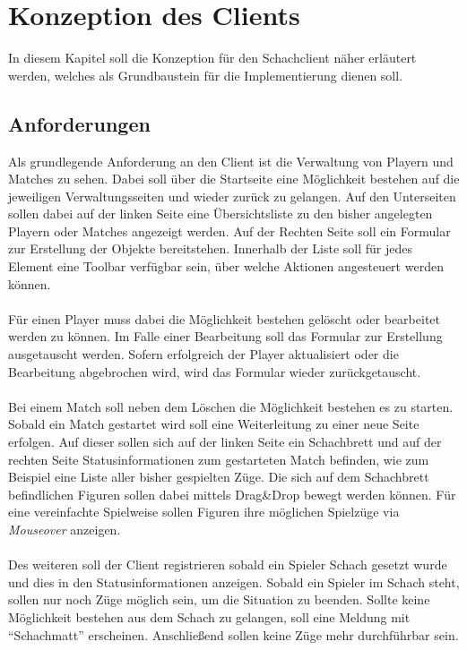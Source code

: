 
\chapter{Konzeption des Clients}
In diesem Kapitel soll die Konzeption für den Schachclient näher erläutert werden, welches als Grundbaustein für die Implementierung dienen soll. 

\section{Anforderungen}
Als grundlegende Anforderung an den Client ist die Verwaltung von Playern und Matches zu sehen. Dabei soll über die Startseite eine Möglichkeit bestehen auf die jeweiligen Verwaltungsseiten und wieder zurück zu gelangen. Auf den Unterseiten sollen dabei auf der linken Seite eine Übersichtsliste zu den bisher angelegten Playern oder Matches angezeigt werden. Auf der Rechten Seite soll ein Formular zur Erstellung der Objekte bereitstehen. Innerhalb der Liste soll für jedes Element eine Toolbar verfügbar sein, über welche Aktionen angesteuert werden können. \\
\\
Für einen Player muss dabei die Möglichkeit bestehen gelöscht oder bearbeitet werden zu können. Im Falle einer Bearbeitung soll das Formular zur Erstellung ausgetauscht werden. Sofern erfolgreich der Player aktualisiert oder die Bearbeitung abgebrochen wird, wird das Formular wieder zurückgetauscht.\\
\\
Bei einem Match soll neben dem Löschen die Möglichkeit bestehen es zu starten. Sobald ein Match gestartet wird soll eine Weiterleitung zu einer neue Seite erfolgen. Auf dieser sollen sich auf der linken Seite ein Schachbrett und auf der rechten Seite Statusinformationen zum gestarteten Match befinden, wie zum Beispiel eine Liste aller bisher gespielten Züge. Die sich auf dem Schachbrett befindlichen Figuren sollen dabei mittels Drag\&Drop bewegt werden können. Für eine vereinfachte Spielweise sollen Figuren ihre möglichen Spielzüge via \textit{Mouseover} anzeigen.\\
\\
Des weiteren soll der Client registrieren sobald ein Spieler Schach gesetzt wurde und dies in den Statusinformationen anzeigen. Sobald ein Spieler im Schach steht, sollen nur noch Züge möglich sein, um die Situation zu beenden. Sollte keine Möglichkeit bestehen aus dem Schach zu gelangen, soll eine Meldung mit \enquote{Schachmatt} erscheinen. Anschließend sollen keine Züge mehr durchführbar sein.


